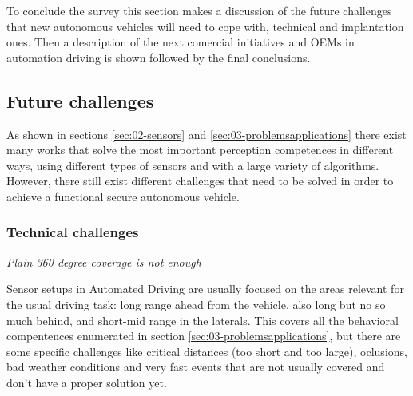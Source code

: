 
To conclude the survey this section makes a discussion of the future challenges that new autonomous vehicles will need to cope with, technical and implantation ones. Then a description of the next comercial initiatives and OEMs in automation driving is shown followed by the final conclusions.



\subsection{Future challenges}

As shown in sections \ref{sec:02-sensors} and \ref{sec:03-problemsapplications} there exist many works that solve the most important perception competences in different ways, using different types of sensors and with a large variety of algorithms. However, there still exist different challenges that need to be solved in order to achieve a functional secure autonomous vehicle. 

\subsubsection{Technical challenges}


\emph{Plain 360 degree coverage is not enough}

Sensor setups in Automated Driving are usually focused on the areas relevant for the usual driving task: long range ahead from the vehicle, also long but no so much behind, and short-mid range in the laterals. This covers all the behavioral compentences enumerated in section \ref{sec:03-problemsapplications}, but there are some specific challenges like critical distances (too short and too large), oclusions, bad weather conditions and very fast events that are not usually covered and don't have a proper solution yet.


